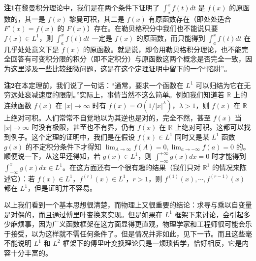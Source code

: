 \noindent\textbf{注1}\quad 在黎曼积分理论中，我们是在两个条件下证明了 $\int_a^xf(t)dt$ 是 $f(x)$ 的原函数的，其一是 $f(x)$ 黎曼可积，其二是 $f(x)$ 有原函数存在（即处处适合 $F'(x)=f(x)$ 的 $F(x)$）存在。在勒贝格积分中我们也不能说只要 $f(x)\in L^1$，则 $\int_a^xf(t)dt$ 一定是 $f(x)$ 的原函数，而只能得到 $\int_a^xf(t)dt$ 在几乎处处意义下是 $f(x)$ 的原函数。就是说，即令用勒贝格积分理论，也不能完全回答有可变积分限的积分（即不定积分）与原函数这两个概念是否完全一致，因为这里涉及一些比较细微问题，这是在这个定理证明中留下的一个“陷阱”。

\noindent\textbf{注2}\quad 在本定理前，我们说了一句话：“通常，要求一个函数在 $L^1$ 可以归结为它在无穷远处衰减速度的限制。”实际上，事情当然不这么简单。例如我们知道若 $\mathbb R$ 上的连续函数 $f(x)$ 在 $|x|\to\infty$ 时有 $f(x)=O(1/|x|^\lambda)$，$\lambda>1$，则 $f(x)$ 在 $\mathbb R$ 上绝对可积。人们常常不自觉地以为其逆也是对的，完全不然，甚至 $f(x)$ 当 $|x|\to\infty$ 时没有极限，甚至也不有界，仍有 $f(x)$ 在 $\mathbb R$ 上绝对可积。这都可以找到例子。这个定理的证明中，我们是在假设 $f(x)\in L^1$ 同时又是某 $L^1$ 函数 $g(x)$ 的不定积分条件下才得知 $\lim_{A\to\infty}f(A)=0,\lim_{a\to-\infty}f(a)=0$ 的。顺便说一下，从这里还得知，若 $g(x)\in L^1$，则 $\int_{-\infty}^{+\infty}g(x)dx=0$ 时才能得到 $\int_{-\infty}^{x}g(x)dx\in L^1$。在这方面还有一个很有趣的结果（我们只对 $\mathbb R^1$ 的情况来陈述它）：若 $f(x)\in L^1$，$f^{(r)}(x)\in L^1$，$r>1$，则 $f^{(1)}(x),\cdots,f^{(r-1)}(x)$ 都在 $L^1$，但是证明并不容易。

以上我们看到一个基本思想很清楚，而物理上又很重要的结论：求导与乘以自变量是对偶的，而且通过傅里叶变换来实现。但是如果在 $L^1$ 框架下来讨论，会引起多少麻烦事，因为广义函数框架在这方面显得更直观，物理学家和工程师很可能会乐于接受，以为这样就不需任何条件了。但是情况并非如此，见下一节。而且这些毫不能说明 $L^1$ 和 $L^2$ 框架下的傅里叶变换理论只是一烦琐哲学，恰好相反，它是内容十分丰富的。

